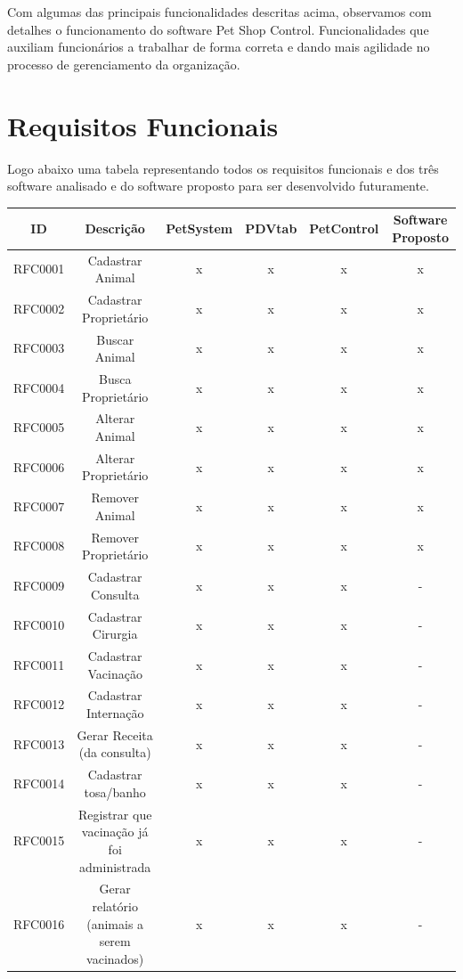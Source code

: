 \documentclass[12pt,openright,twoside,a4paper,english,french,spanish,brazil]{abntex2}
\begin{document}
Com algumas das principais funcionalidades descritas acima, observamos com detalhes o funcionamento do software Pet Shop Control. Funcionalidades que auxiliam funcionários a trabalhar de forma correta e dando mais agilidade no processo de gerenciamento da organização.
\newpage
\section*{Requisitos Funcionais}
Logo abaixo uma tabela representando todos os requisitos funcionais e dos três software analisado e do software proposto para ser desenvolvido futuramente.

\begin{table}[!htpb]
\centering
\begin{small} 
\setlength{\tabcolsep}{3pt} 
\begin{tabular}{rccccc}
    \toprule
    \multicolumn{1}{c}{\textbf{ID}} & \textbf{Descrição} & \textbf{PetSystem} & \textbf{PDVtab} & \textbf{PetControl} & \textbf{Software Proposto} \\
    \midrule
    RFC0001 & Cadastrar Animal & x & x & x & x \\
    RFC0002 & Cadastrar Proprietário & x & x & x & x \\
    RFC0003 & Buscar Animal & x & x & x & x \\
    RFC0004 & Busca Proprietário & x & x & x & x \\
    RFC0005 & Alterar Animal & x & x & x & x \\
    RFC0006 & Alterar Proprietário & x & x & x & x \\
    RFC0007 & Remover Animal & x & x & x & x \\
    RFC0008 & Remover Proprietário & x & x & x & x \\
    RFC0009 & Cadastrar Consulta & x & x & x & - \\
    RFC0010 & Cadastrar Cirurgia & x & x & x & - \\
    RFC0011 & Cadastrar Vacinação & x & x & x & - \\
    RFC0012 & Cadastrar Internação & x & x & x & - \\
    RFC0013 & Gerar Receita (da consulta) & x & x & x & - \\
    RFC0014 & Cadastrar tosa/banho & x & x & x & - \\
    RFC0015 & Registrar que vacinação já foi administrada & x & x & x & - \\
    RFC0016 & Gerar relatório (animais a serem vacinados) & x & x & x & - \\

\end{tabular}
\end{small}
\end{table}
\end{document}
